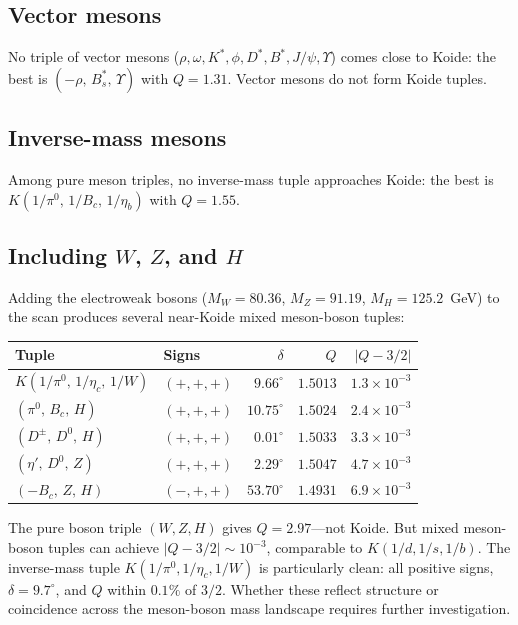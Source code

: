 \documentclass[11pt]{article}
\begin{document}
\subsection{Vector mesons}

No triple of vector mesons ($\rho, \omega, K^*, \phi, D^*, B^*,
J/\psi, \Upsilon$) comes close to Koide: the best is
$(-\rho,\, B_s^*,\, \Upsilon)$ with $Q = 1.31$.
Vector mesons do not form Koide tuples.

\subsection{Inverse-mass mesons}

Among pure meson triples, no inverse-mass tuple approaches Koide:
the best is $K(1/\pi^0,\,1/B_c,\,1/\eta_b)$ with $Q = 1.55$.

\subsection{Including $W$, $Z$, and $H$}

Adding the electroweak bosons ($M_W = 80.36$, $M_Z = 91.19$,
$M_H = 125.2$~GeV) to the scan produces several near-Koide
mixed meson-boson tuples:

\begin{center}
\small
\begin{tabular}{@{}l l r r r@{}}
\toprule
Tuple & Signs & $\delta$ & $Q$ & $|Q\!-\!3/2|$ \\
\midrule
$K(1/\pi^0,\,1/\eta_c,\,1/W)$ & $(+,+,+)$ & $9.66^\circ$ & $1.5013$ & $1.3\times 10^{-3}$ \\
$(\pi^0,\,B_c,\,H)$ & $(+,+,+)$ & $10.75^\circ$ & $1.5024$ & $2.4\times 10^{-3}$ \\
$(D^\pm,\,D^0,\,H)$ & $(+,+,+)$ & $0.01^\circ$ & $1.5033$ & $3.3\times 10^{-3}$ \\
$(\eta',\,D^0,\,Z)$ & $(+,+,+)$ & $2.29^\circ$ & $1.5047$ & $4.7\times 10^{-3}$ \\
$(-B_c,\,Z,\,H)$ & $(-,+,+)$ & $53.70^\circ$ & $1.4931$ & $6.9\times 10^{-3}$ \\
\bottomrule
\end{tabular}
\end{center}

\noindent
The pure boson triple $(W,Z,H)$ gives $Q = 2.97$---not Koide.
But mixed meson-boson tuples can achieve $|Q-3/2| \sim 10^{-3}$,
comparable to $K(1/d,1/s,1/b)$.  The inverse-mass tuple
$K(1/\pi^0,1/\eta_c,1/W)$ is particularly clean: all positive signs,
$\delta = 9.7^\circ$, and $Q$ within $0.1\%$ of $3/2$.
Whether these reflect structure or coincidence across
the meson-boson mass landscape requires further investigation.
\end{document}
